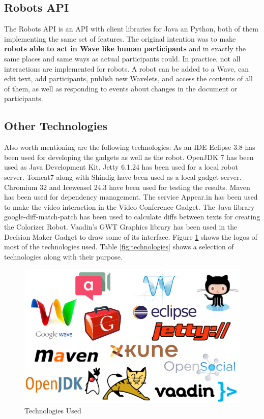 \subsection{Robots API}
The Robots API \cite{ref:robots_api} is an API with client libraries for Java an Python, both of them implementing the same set of features. The original intention was to make \textbf{robots able to act in Wave like human participants} and in exactly the same places and same ways as actual participants could. In practice, not all interactions are implemented for robots. A robot can be added to a Wave, can edit text, add participants, publish new Wavelets, and access the contents of all of them, as well as responding to events about changes in the document or participants.

\subsection{Other Technologies}
Also worth mentioning are the following technologies:
As an IDE Eclipse \cite{ref:eclipse} 3.8 has been used for developing the gadgets as well as the robot. OpenJDK \cite{ref:openjdk} 7 has been used as Java Development Kit. Jetty \cite{ref:jetty} 6.1.24 has been used for a local robot server. Tomcat7 \cite{ref:tomcat} along with Shindig have been used as a local gadget server. Chromium \cite{ref:chromium} 32 and Iceweasel \cite{ref:iceweasel} 24.3 have been used for testing the results. Maven \cite{ref:maven} has been used for dependency management. The service Appear.in has been used to make the video interaction in the Video Conference Gadget. The Java library google-diff-match-patch has been used to calculate diffs between texts for creating the Colorizer Robot. Vaadin's GWT Graphics library has been used in the Decision Maker Gadget to draw some of its interface. Figure \ref{fig:logos} shows the logos of most of the technologies used. Table \ref{fig:technologies} shows a selection of technologies along with their purpose.
\begin{figure}[h]
  \center
    \includegraphics[keepaspectratio, scale=0.45]{Media/logos.png}
  \caption{Technologies Used}
  \label{fig:logos}
\end{figure}
